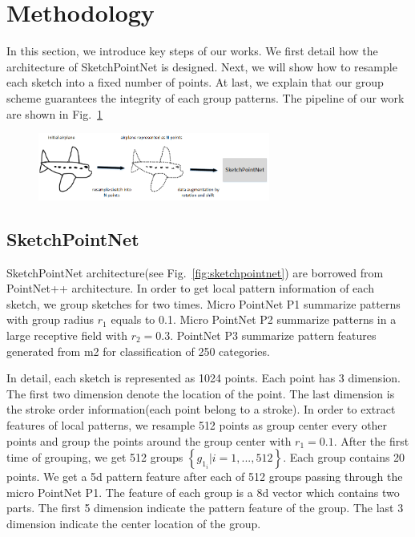 \section{Methodology}
\label{sec:methodology}

In this section, we introduce key steps of our works. We first detail how the architecture of SketchPointNet is designed. Next, we will show how to resample each sketch into a fixed number of points. At last, we explain that our group scheme guarantees the integrity of each group patterns. The pipeline of our work are shown in Fig.~\ref{fig:pp}

\begin{figure}[htbp]
    \center
    \includegraphics[width=3in]{images/pp.png}
    \label{fig:pp}
\end{figure}

\subsection{SketchPointNet}
\label{ssec:sketch_point_net}

SketchPointNet architecture(see Fig.~\ref{fig:sketchpointnet}) are borrowed from PointNet++ architecture. In order to get local pattern information of each sketch, we group sketches for two times. Micro PointNet P1 summarize patterns with group radius $r_1$ equals to 0.1. Micro PointNet P2 summarize patterns in a large receptive field with $r_2 = 0.3$. PointNet P3 summarize pattern features generated from m2 for classification of 250 categories.

In detail, each sketch is represented as 1024 points. Each point has 3 dimension. The first two dimension denote the location of the point. The last dimension is the stroke order information(each point belong to a stroke). In order to extract features of local patterns, we resample 512 points as group center every other points and group the points around the group center with $r_1 = 0.1$. After the first time of grouping, we get 512 groups $\left\{ g_{1_i}| i = 1, ..., 512 \right\}$. Each group contains 20 points. We get a 5d pattern feature after each of 512 groups passing through the micro PointNet P1. The feature of each group is a 8d vector which contains two parts. The first 5 dimension indicate the pattern feature of the group. The last 3 dimension indicate the center location of the group.

